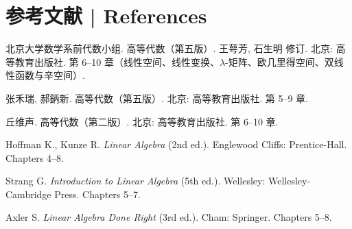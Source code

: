 \documentclass[UTF8,11pt,a4paper]{ctexart}
\begin{document}
\section*{参考文献 | References}
\begin{enumerate}[label={[\arabic*]}]
\item 北京大学数学系前代数小组. 高等代数（第五版）. 王萼芳, 石生明 修订. 北京: 高等教育出版社. 第 6--10 章（线性空间、线性变换、$\lambda$-矩阵、欧几里得空间、双线性函数与辛空间）.
\item 张禾瑞, 郝鈵新. 高等代数（第五版）. 北京: 高等教育出版社. 第 5--9 章.
\item 丘维声. 高等代数（第二版）. 北京: 高等教育出版社. 第 6--10 章.
\item Hoffman K., Kunze R. \emph{Linear Algebra} (2nd ed.). Englewood Cliffs: Prentice-Hall. Chapters 4--8.
\item Strang G. \emph{Introduction to Linear Algebra} (5th ed.). Wellesley: Wellesley-Cambridge Press. Chapters 5--7.
\item Axler S. \emph{Linear Algebra Done Right} (3rd ed.). Cham: Springer. Chapters 5--8.
\end{enumerate}
\end{document}
